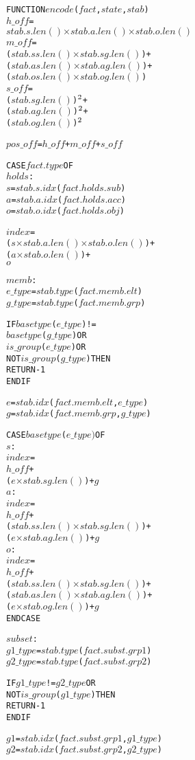 \documentclass[10pt, twocolumn]{article}
\begin{document}
          \begin{alltt}
FUNCTION \(encode\)(\(fact\), \(state\), \(stab\))
  \(h\_off\) =
    \(stab.s.len()\) \(\times\) \(stab.a.len()\) \(\times\) \(stab.o.len()\)
  \(m\_off\) =
    (\(stab.ss.len()\) \(\times\) \(stab.sg.len()\)) +
    (\(stab.as.len()\) \(\times\) \(stab.ag.len()\)) +
    (\(stab.os.len()\) \(\times\) \(stab.og.len()\))
  \(s\_off\) =
    (\(stab.sg.len()\))\(\sp{2}\) +
    (\(stab.ag.len()\))\(\sp{2}\) +
    (\(stab.og.len()\))\(\sp{2}\)

  \(pos\_off\) = \(h\_off\) + \(m\_off\) + \(s\_off\)

  CASE \(fact.type\) OF
    \(holds\) : 
      \(s\) = \(stab.s.idx\)(\(fact.holds.sub\))
      \(a\) = \(stab.a.idx\)(\(fact.holds.acc\))
      \(o\) = \(stab.o.idx\)(\(fact.holds.obj\))

      \(index\) =
       (\(s\) \(\times\) \(stab.a.len()\) \(\times\) \(stab.o.len()\)) +
       (\(a\) \(\times\) \(stab.o.len()\)) +
       \(o\)

    \(memb\) :
      \(e\_type\) = \(stab.type\)(\(fact.memb.elt\))
      \(g\_type\) = \(stab.type\)(\(fact.memb.grp\))

      IF \(basetype\)(\(e\_type\)) !=
         \(basetype\)(\(g\_type\)) OR 
         \(is\_group\)(\(e\_type\)) OR
         NOT \(is\_group\)(\(g\_type\)) THEN
        RETURN -1
      ENDIF

      \(e\) = \(stab.idx\)(\(fact.memb.elt\), \(e\_type\))
      \(g\) = \(stab.idx\)(\(fact.memb.grp\), \(g\_type\))
      
      CASE \(basetype\)(\(e\_type)\) OF
        \(s\) : 
          \(index\) =
            \(h\_off\) +
            (\(e\) \(\times\) \(stab.sg.len()\)) + \(g\)
        \(a\) : 
          \(index\) =
            \(h\_off\) +
            (\(stab.ss.len()\) \(\times\) \(stab.sg.len()\)) +
            (\(e\) \(\times\) \(stab.ag.len()\)) + \(g\)
        \(o\) :
          \(index\) =
            \(h\_off\) +
            (\(stab.ss.len()\) \(\times\) \(stab.sg.len()\)) +
            (\(stab.as.len()\) \(\times\) \(stab.ag.len()\)) +
            (\(e\) \(\times\) \(stab.og.len()\)) + \(g\)
      ENDCASE

    \(subset\) :
      \(g1\_type\) = \(stab.type\)(\(fact.subst.grp1\))
      \(g2\_type\) = \(stab.type\)(\(fact.subst.grp2\))

      IF \(g1\_type\) != \(g2\_type\) OR
         NOT \(is\_group\)(\(g1\_type\)) THEN
        RETURN -1
      ENDIF

      \(g1\) = \(stab.idx\)(\(fact.subst.grp1\), \(g1\_type\))
      \(g2\) = \(stab.idx\)(\(fact.subst.grp2\), \(g2\_type\))
      

\end{alltt}
\end{document}
